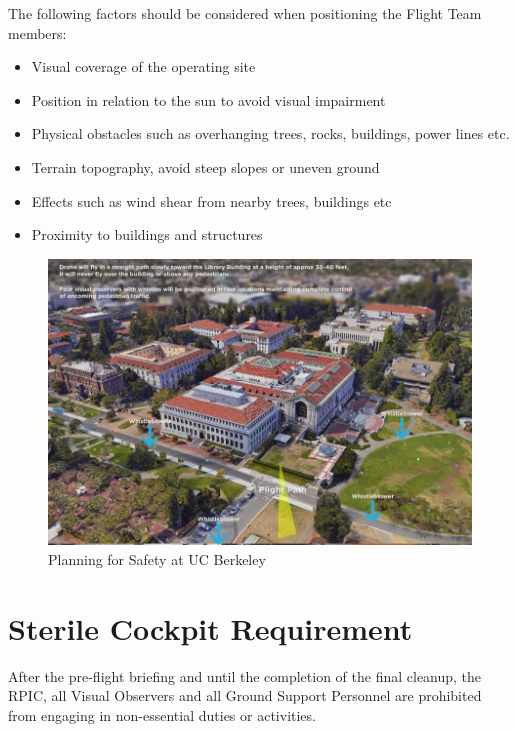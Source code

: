 \documentclass[
]{book}
\providecommand{\tightlist}{%
  \setlength{\itemsep}{0pt}\setlength{\parskip}{0pt}}
\begin{document}
The following factors should be considered when positioning the Flight Team members:

\begin{itemize}
\tightlist
\item
  Visual coverage of the operating site
\item
  Position in relation to the sun to avoid visual impairment
\item
  Physical obstacles such as overhanging trees, rocks, buildings, power lines etc.
\item
  Terrain topography, avoid steep slopes or uneven ground
\item
  Effects such as wind shear from nearby trees, buildings etc
\item
  Proximity to buildings and structures
\end{itemize}

\begin{figure}

{\centering \includegraphics[width=1\linewidth]{images/Mission_Planning_UCB} 

}

\caption{Planning for Safety at UC Berkeley}\label{fig:MP-UCB}
\end{figure}

\section{Sterile Cockpit Requirement}\label{sterile-cockpit-requirement}

After the pre-flight briefing and until the completion of the final cleanup, the RPIC, all Visual Observers and all Ground Support Personnel are prohibited from engaging in non-essential duties or activities.
\end{document}

